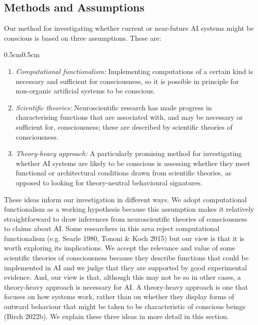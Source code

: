 \documentclass[12pt]{article}
\begin{document}
\subsection{Methods and Assumptions}
Our method for investigating whether current or near-future AI systems might be conscious is based on three assumptions. These are:

\begin{adjustwidth}{0.5cm}{0.5cm}
\begin{enumerate}
    \item \textit{Computational functionalism:} Implementing computations of a certain kind is necessary and sufficient for consciousness, so it is possible in principle for non-organic artificial systems to be conscious.
    \item \textit{Scientific theories:} Neuroscientific research has made progress in characterising functions that are associated with, and may be necessary or sufficient for, consciousness; these are described by scientific theories of consciousness.
    \item \textit{Theory-heavy approach:} A particularly promising method for investigating whether AI systems are likely to be conscious is assessing whether they meet functional or architectural conditions drawn from scientific theories, as opposed to looking for theory-neutral behavioural signatures.
\end{enumerate}
\end{adjustwidth}

These ideas inform our investigation in different ways. We adopt computational functionalism as a working hypothesis because this assumption makes it relatively straightforward to draw inferences from neuroscientific theories of consciousness to claims about AI. Some researchers in this area reject computational functionalism (e.g. Searle 1980, Tononi \& Koch 2015) but our view is that it is worth exploring its implications. We accept the relevance and value of some scientific theories of consciousness because they describe functions that could be implemented in AI and we judge that they are supported by good experimental evidence. And, our view is that, although this may not be so in other cases, a theory-heavy approach is necessary for AI. A theory-heavy approach is one that focuses on how systems work, rather than on whether they display forms of outward behaviour that might be taken to be characteristic of conscious beings (Birch 2022b). We explain these three ideas in more detail in this section.
\end{document}
